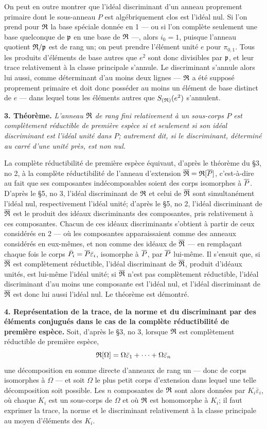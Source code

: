 On peut en outre montrer que l'idéal discriminant d'un anneau proprement primaire dont le sous-anneau $P$ est algébriquement clos est l'idéal nul. Si l'on prend pour $\mathfrak R$ la base spéciale donnée en 1 --- ou si l'on complète seulement une base quelconque de $\mathfrak p$ en une base de $\mathfrak R$ ---, alors $i_0=1$, puisque l'anneau quotient $\mathfrak R/\mathfrak p$ est de rang un; on peut prendre l'élément unité $e$ pour $\pi_{0,1}$. Tous les produits d'éléments de base autres que $e^2$ sont donc divisibles par $\mathfrak p$, et leur trace relativement à la classe principale s'annule. Le discriminant s'annule alors lui aussi, comme déterminant d'au moins deux lignes --- $\mathfrak R$ a été supposé proprement primaire et doit donc posséder au moins un élément de base distinct de $e$ --- dans lequel tous les éléments autres que $S_{(\mathfrak R)}(e^2)$ s'annulent.

\textbf{3. Théorème.} \emph{L'anneau $\mathfrak R$ de rang fini relativement à un sous-corps $P$ est complètement réductible de première espèce si et seulement si son idéal discriminant est l'idéal unité dans $P$; autrement dit, si le discriminant, déterminé au carré d'une unité près, est non nul.}

La complète réductibilité de première espèce équivaut, d'après le théorème du \S 3, no 2, à la complète réductibilité de l'anneau d'extension $\overline{\mathfrak R}=\mathfrak R[\overline P]$, c'est-à-dire au fait que ses composantes indécomposables soient des corps isomorphes à $\overline P$. D'après le \S 5, no 3, l'idéal discriminant de $\mathfrak R$ et celui de $\overline{\mathfrak R}$ sont simultanément l'idéal nul, respectivement l'idéal unité; d'après le \S 5, no 2, l'idéal discriminant de $\overline{\mathfrak R}$ est le produit des idéaux discriminants des composantes, pris relativement à ces composantes. Chacun de ces idéaux discriminants s'obtient à partir de ceux considérés en 2 --- où les composantes apparaissaient comme des anneaux considérés en eux-mêmes, et non comme des idéaux de $\overline{\mathfrak R}$ --- en remplaçant chaque fois le corps $\bar P_i=\overline P\bar\varepsilon_i$, isomorphe à $\overline P$, par $\overline P$ lui-même. Il s'ensuit que, si $\overline{\mathfrak R}$ est complètement réductible, l'idéal discriminant de $\overline{\mathfrak R}$, produit d'idéaux unités, est lui-même l'idéal unité; si $\overline{\mathfrak R}$ n'est pas complètement réductible, l'idéal discriminant d'au moins une composante est l'idéal nul, et l'idéal discriminant de $\overline{\mathfrak R}$ est donc lui aussi l'idéal nul. Le théorème est démontré.

\textbf{4. Représentation de la trace, de la norme et du discriminant par des éléments conjugués dans le cas de la complète réductibilité de première espèce.} Soit, d'après le \S 3, no 3, lorsque $\mathfrak R$ est complètement réductible de première espèce,
\[
\mathfrak R[\Omega]=\Omega\bar\varepsilon_1+\cdots+\Omega\bar\varepsilon_n
\]
une décomposition en somme directe d'anneaux de rang un --- donc de corps isomorphes à $\Omega$ --- et soit $\Omega$ le plus petit corps d'extension dans lequel une telle décomposition soit possible. Les $n$ composantes de $\mathfrak R$ sont alors données par $K_i\bar\varepsilon_i$, où chaque $K_i$ est un sous-corps de $\Omega$ et où $\mathfrak R$ est homomorphe à $K_i$; il faut exprimer la trace, la norme et le discriminant relativement à la classe principale au moyen d'éléments des $K_i$.

